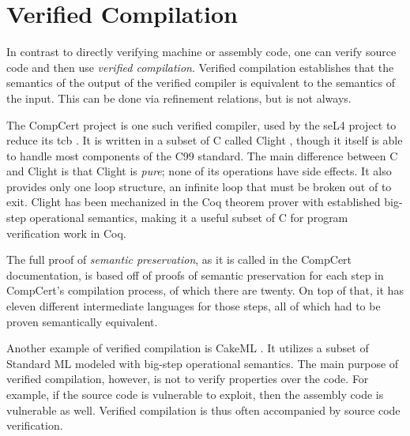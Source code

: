 \section{Verified Compilation}\label{se:verified}
In contrast to directly verifying machine or assembly code,
one can verify source code and then use \emph{verified compilation}.%
Verified compilation establishes that
the semantics of the output of the verified compiler
is equivalent to the semantics of the input.
This can be done via refinement relations, but is not always.

The CompCert project is one such verified compiler,
used by the seL4 project to reduce its \ac{tcb} \autocite{Klein_AEMSKH_14}.
It is written in a subset of C
called Clight \autocite{leroy:compcert,blazy2009clight},
though it itself is able to handle most components of the C99 standard.
The main difference between C and Clight is that Clight is \emph{pure};
none of its operations have side effects. It also provides only one loop structure,
an infinite loop that must be broken out of to exit.
Clight has been mechanized in the Coq theorem prover with established
big-step operational semantics, making it a useful subset of C
for program verification work in Coq.

The full proof of \emph{semantic preservation},
as it is called in the CompCert documentation,
is based off of proofs of semantic preservation
for each step in CompCert's compilation process, of which there are twenty.
On top of that, it has eleven different intermediate languages for those steps,
all of which had to be proven semantically equivalent.

Another example of verified compilation is CakeML \autocite{kumar2014cakeml}.
It utilizes a subset of Standard ML modeled with big-step operational semantics.
The main purpose of verified compilation, however,
is not to verify properties over the code.
For example, if the source code is vulnerable to  exploit,
then the assembly code is vulnerable as well.
Verified compilation is thus often accompanied by source code verification.

